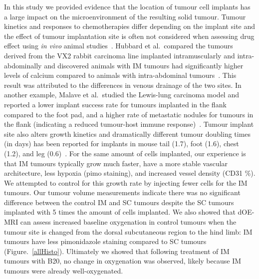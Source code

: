 In this study we provided evidence that the location of tumour cell implants has a large impact on the microenvironment of the resulting solid tumour.
Tumour kinetics and responses to chemotherapies differ depending on the implant site and the effect of tumour implantation site is often not considered when assessing drug effect using \emph{in vivo} animal studies~\cite{Arjona:2006ch}.
Hubbard et al.\ compared the tumours derived from the VX2 rabbit carcinoma line implanted intramuscularly and intra-abdominally and discovered animals with \acs{IM} tumours had significantly higher levels of calcium compared to animals with intra-abdominal tumours~\cite{Hubbard:1980vf}.
This result was attributed to the differences in venous drainage of the two sites.
In another example, Malave et al.\ studied the Lewis-lung carcinoma model and reported a lower implant success rate for tumours implanted in the flank compared to the foot pad, and a higher rate of metastatic nodules for tumours in the flank (indicating a reduced tumour-host immune response)~\cite{Malave:1979ui}.
Tumour implant site also alters growth kinetics and dramatically different tumour doubling times (in days) has been reported for implants in mouse tail (1.7), foot (1.6), chest (1.2), and leg (0.6)~\cite{Hill:1982ci}.
For the same amount of cells implanted, our experience is that \acs{IM} tumours typically grow much faster, have a more stable vascular architecture, less hypoxia (pimo staining), and increased vessel density (CD31 \%).
We attempted to control for this growth rate by injecting fewer cells for the \acs{IM} tumours. 
Our tumour volume measurements indicate there was no significant difference between the control \acs{IM} and \acs{SC} tumours despite the \acs{SC} tumours implanted with 5 times the amount of cells implanted.
We also showed that \acs{dOE-MRI} can assess increased baseline oxygenation in control tumours when the tumour site is changed from the dorsal subcutaneous region to the hind limb: \acs{IM} tumours have less pimonidazole staining compared to \acs{SC} tumours (Figure.~\ref{allHisto}).
Ultimately we showed that following treatment of \acs{IM} tumours with B20, no change in oxygenation was observed, likely because \acs{IM} tumours were already well-oxygenated.

